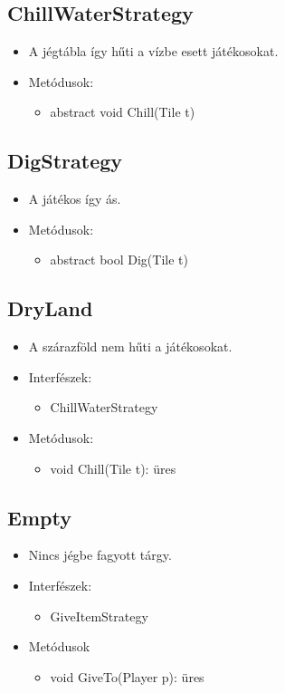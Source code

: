 \subsection{ChillWaterStrategy}
\begin{itemize}
	\item A jégtábla így hűti a vízbe esett játékosokat.\\
	
\item Metódusok:
\begin{itemize}
	\item abstract void Chill(Tile t)
\end{itemize}
\end{itemize}

\subsection{DigStrategy}
\begin{itemize}
	\item A játékos így ás.\\
	
\item Metódusok:
\begin{itemize}
	\item abstract bool Dig(Tile t)
\end{itemize}
\end{itemize}

\subsection{DryLand}
\begin{itemize}
	\item A szárazföld nem hűti a játékosokat.\\
	
\item Interfészek:
	\begin{itemize}
		\item ChillWaterStrategy
	\end{itemize}
\item Metódusok:
\begin{itemize}
	\item void Chill(Tile t): üres
\end{itemize}
\end{itemize}

\subsection{Empty}
\begin{itemize}
	\item Nincs jégbe fagyott tárgy.
	
\item Interfészek:
	\begin{itemize}
		\item GiveItemStrategy
	\end{itemize}
\item Metódusok
\begin{itemize}
	\item void GiveTo(Player p): üres
\end{itemize}
\end{itemize}

